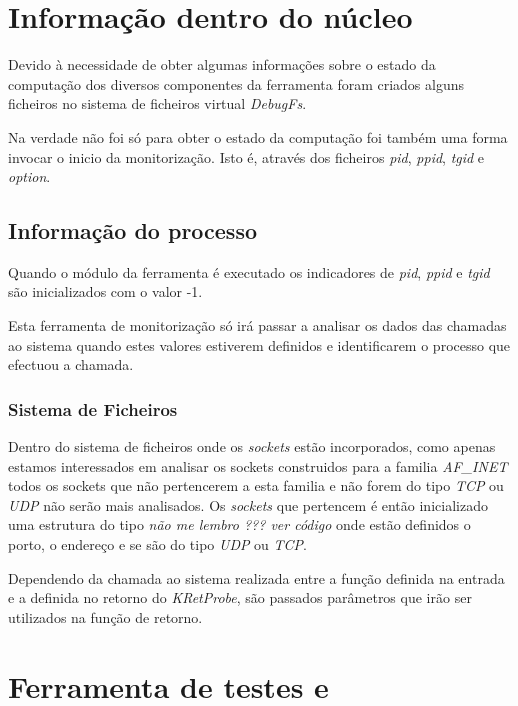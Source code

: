 \section{Informação dentro do núcleo}

Devido à necessidade de obter algumas informações sobre o estado da computação dos diversos componentes da ferramenta foram criados alguns ficheiros no
sistema de ficheiros virtual \textit{DebugFs}.

Na verdade não foi só para obter o estado da computação foi também uma forma invocar o inicio da monitorização.
 Isto é, através dos ficheiros \textit{pid}, \textit{ppid}, \textit{tgid} e \textit{option}. 

\subsection{Informação do processo}

Quando o módulo da ferramenta é executado os indicadores de \textit{pid}, \textit{ppid} e \textit{tgid} são inicializados com o valor -1.

Esta ferramenta de monitorização só irá passar a analisar os dados das chamadas ao sistema quando estes valores estiverem definidos e identificarem o processo que efectuou a chamada.

\subsubsection{Sistema de Ficheiros}

Dentro do sistema de ficheiros onde os \textit{sockets} estão incorporados, como apenas estamos interessados em analisar os sockets construidos para a
familia \textit{AF\_INET} todos os sockets que não pertencerem a esta familia e não forem do tipo \textit{TCP} ou \textit{UDP} não serão mais analisados.
 Os \textit{sockets} que pertencem é então inicializado uma estrutura do tipo \textit{não me lembro ??? ver código} onde estão definidos o porto, o endereço
e se são do tipo \textit{UDP} ou \textit{TCP}.

Dependendo da chamada ao sistema realizada entre a função definida na entrada e a definida no retorno do \textit{KRetProbe}, são passados parâmetros que irão
ser utilizados na função de retorno.


\section{Ferramenta de testes e}


